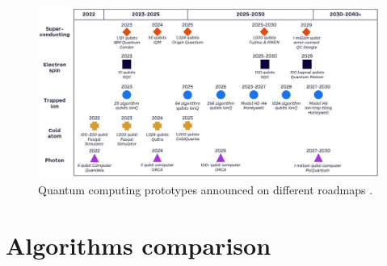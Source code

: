 \begin{figure}[ht]
  \centering
  \includegraphics[width=\textwidth]{figures/Quantum computing roadmaps.jpg}
  \caption{Quantum computing prototypes announced on different roadmaps \cite{BibEntry2022May}.} \label{Quantum computing roadmaps}
\end{figure}

\section{Algorithms comparison}

